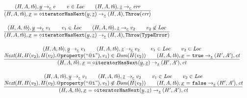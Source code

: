 \[
\begin{array}{l@{~~}l@{~~}ll}
\frac{\begin{matrix}
\evale, \ir{y} \rightarrow_{\ir\expr} v
\rulesep
v\in\Loc
\rulesep
\evale, \ir{z} \rightarrow_{\ir\expr} \err
\end{matrix}}{\begin{matrix}
\state, \irid \ {\tt = {\diamond}iteratorHasNext}(\ir{y}, \ir{z})  \rightarrow_{\ir\stmt} \res, \error
\end{matrix}}
\\[2em]

\frac{\begin{matrix}
\evale, \ir{y} \rightarrow_{\ir\expr} v_1
\rulesep
v_1\in\Loc
\rulesep
\evale, \ir{z} \rightarrow_{\ir\expr} v_2
\rulesep
v_2\not\in\Loc
\end{matrix}}{\begin{matrix}
\state, \irid \ {\tt = {\diamond}iteratorHasNext}(\ir{y}, \ir{z})  \rightarrow_{\ir\stmt} \res, \thte
\end{matrix}}
\\[2em]

\frac{\begin{matrix}
\evale, \ir{y} \rightarrow_{\ir\expr} v_1
\rulesep
\evale, \ir{z} \rightarrow_{\ir\expr} v_2
\rulesep
v_1\in\Loc
\rulesep
v_2\in\Loc
\\
\hf{Next}(H, H(v_2), H(v_2).{\tt@property}({\tt``@i"}),v_1)%
\in\hf{Dom}(H(v_2))
\rulesep
\state, \irid \ {\tt =} \ \true \rightarrow_{\ir\stmt} \resp, \ct
\end{matrix}}{\begin{matrix}
\state, \irid \ {\tt = {\diamond}iteratorHasNext}(\ir{y}, \ir{z})  \rightarrow_{\ir\stmt} \resp, \ct
\end{matrix}}
\\[2em]

\frac{\begin{matrix}
\evale, \ir{y} \rightarrow_{\ir\expr} v_1
\rulesep
\evale, \ir{z} \rightarrow_{\ir\expr} v_2
\rulesep
v_1\in\Loc
\rulesep
v_2\in\Loc
\\
\hf{Next}(H, H(v_2), H(v_2).{\tt@property}({\tt``@i"}),v_1)%
\not\in\hf{Dom}(H(v_2))
\rulesep
\state, \irid \ {\tt =} \ \false \rightarrow_{\ir\stmt} \resp, \ct
\end{matrix}}{\begin{matrix}
\state, \irid \ {\tt = {\diamond}iteratorHasNext}(\ir{y}, \ir{z})  \rightarrow_{\ir\stmt} \resp, \ct
\end{matrix}}
\\[2em]


\end{array}\]
